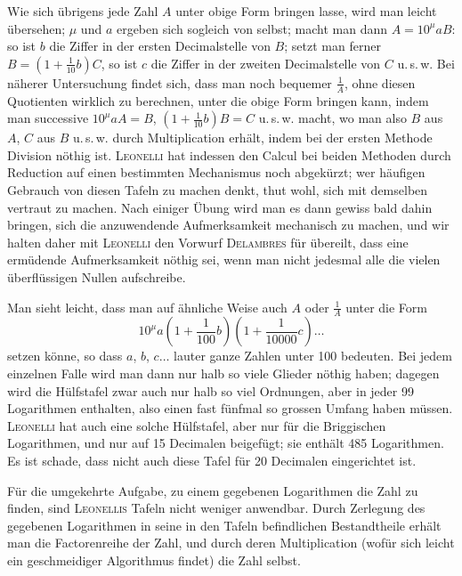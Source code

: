 Wie sich übrigens jede Zahl $A$ unter obige Form bringen lasse, wird man leicht übersehen; $\mu$ und $a$ ergeben sich sogleich von selbst; macht man dann $A = 10^{\mu} a B$: so ist $b$ die Ziffer in der ersten Decimalstelle von $B$; setzt man ferner $B = \left(1+\frac{1}{10} b\right) C$, so ist $c$ die Ziffer in der zweiten Decimalstelle von $C$ u.\,s.\,w. Bei näherer Untersuchung findet sich, dass man noch bequemer $\frac{1}{A}$, ohne diesen Quotienten wirklich zu berechnen, unter die obige Form bringen kann, indem man successive $10^{\mu} a A = B$, $\left(1+\frac{1}{10} b\right) B = C$ u.\,s.\,w. macht, wo man also $B$ aus $A$, $C$ aus $B$ u.\,s.\,w. durch Multiplication erhält, indem bei der ersten Methode Division nöthig ist. \textsc{Leonelli} hat indessen den Calcul bei beiden Methoden durch Reduction auf einen bestimmten Mechanismus noch abgekürzt; wer häufigen Gebrauch von diesen Tafeln zu machen denkt, thut wohl, sich mit demselben vertraut zu machen. Nach einiger Übung wird man es dann gewiss bald dahin bringen, sich die anzuwendende Aufmerksamkeit mechanisch zu machen, und wir halten daher mit \textsc{Leonelli} den Vorwurf \textsc{Delambres} für übereilt, dass eine ermüdende Aufmerksamkeit nöthig sei, wenn man nicht jedesmal alle die vielen überflüssigen Nullen aufschreibe.

Man sieht leicht, dass man auf ähnliche Weise auch $A$ oder $\frac{1}{A}$ unter die Form
\[
10^{\mu} a \left(1+\frac{1}{100} b\right)\left(1+\frac{1}{10000} c\right)\ldots
\]
setzen könne, so dass $a$, $b$, $c\ldots$ lauter ganze Zahlen unter 100 bedeuten. Bei jedem einzelnen Falle wird man dann nur halb so viele Glieder nöthig haben; dagegen wird die Hülfstafel zwar auch nur halb so viel Ordnungen, aber in jeder 99 Logarithmen enthalten, also einen fast fünfmal so grossen Umfang haben müssen. \textsc{Leonelli} hat auch eine solche Hülfstafel, aber nur für die Briggischen Logarithmen, und nur auf 15 Decimalen beigefügt; sie enthält 485 Logarithmen. Es ist schade, dass nicht auch diese Tafel für 20 Decimalen eingerichtet ist.

Für die umgekehrte Aufgabe, zu einem gegebenen Logarithmen die Zahl zu finden, sind \textsc{Leonellis} Tafeln nicht weniger anwendbar. Durch Zerlegung des gegebenen Logarithmen in seine in den Tafeln befindlichen Bestandtheile erhält man die Factorenreihe der Zahl, und durch deren Multiplication (wofür sich leicht ein geschmeidiger Algorithmus findet) die Zahl selbst.

